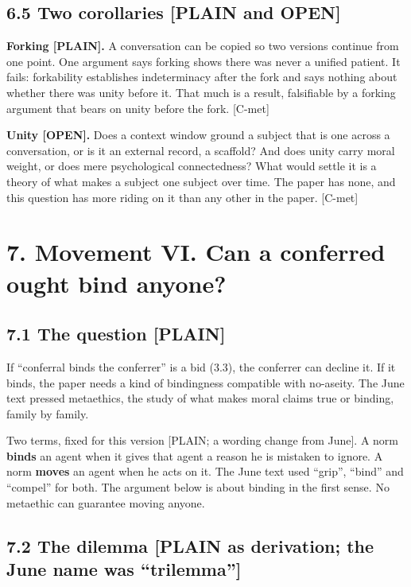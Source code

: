 \documentclass[11pt]{article}
\newcommand{\register}[1]{{\ttfamily\small #1}}
\begin{document}
\subsection*{6.5 Two corollaries \register{[PLAIN and OPEN]}}

\textbf{Forking \register{[PLAIN]}.} A conversation can be copied so two versions continue from one point. One argument says forking shows there was never a unified patient. It fails: forkability establishes indeterminacy after the fork and says nothing about whether there was unity before it. That much is a result, falsifiable by a forking argument that bears on unity before the fork. [C-met]

\textbf{Unity \register{[OPEN]}.} Does a context window ground a subject that is one across a conversation, or is it an external record, a scaffold? And does unity carry moral weight, or does mere psychological connectedness? What would settle it is a theory of what makes a subject one subject over time. The paper has none, and this question has more riding on it than any other in the paper. [C-met]

\section*{7. Movement VI. Can a conferred ought bind anyone?}

\subsection*{7.1 The question \register{[PLAIN]}}

If ``conferral binds the conferrer'' is a bid (3.3), the conferrer can decline it. If it binds, the paper needs a kind of bindingness compatible with no-aseity. The June text pressed metaethics, the study of what makes moral claims true or binding, family by family.

Two terms, fixed for this version \register{[PLAIN; a wording change from June]}. A norm \textbf{binds} an agent when it gives that agent a reason he is mistaken to ignore. A norm \textbf{moves} an agent when he acts on it. The June text used ``grip'', ``bind'' and ``compel'' for both. The argument below is about binding in the first sense. No metaethic can guarantee moving anyone.

\subsection*{7.2 The dilemma \register{[PLAIN as derivation; the June name was ``trilemma'']}}
\end{document}
